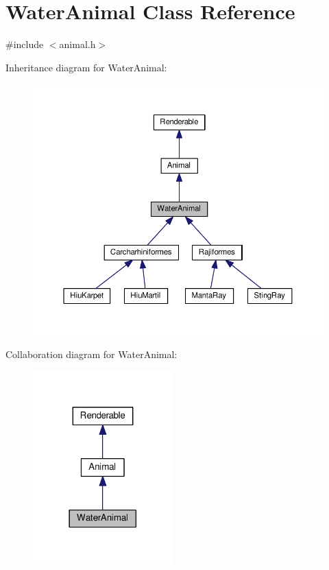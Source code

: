 \hypertarget{classWaterAnimal}{}\section{Water\+Animal Class Reference}
\label{classWaterAnimal}


{\ttfamily \#include $<$animal.\+h$>$}



Inheritance diagram for Water\+Animal\+:
\nopagebreak
\begin{figure}[H]
\begin{center}
\leavevmode
\includegraphics[width=350pt]{classWaterAnimal__inherit__graph}
\end{center}
\end{figure}


Collaboration diagram for Water\+Animal\+:
\nopagebreak
\begin{figure}[H]
\begin{center}
\leavevmode
\includegraphics[width=153pt]{classWaterAnimal__coll__graph}
\end{center}
\end{figure}
